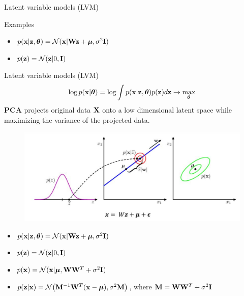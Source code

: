 \begin{frame}{Latent variable models (LVM)}
\begin{block}{Examples}
\begin{minipage}[t]{0.53\columnwidth}
\begin{figure}
			\end{figure}
			\vspace{-0.3cm}
			\begin{itemize}
				\item $p(\mathbf{x} | \mathbf{z}, \boldsymbol{\theta}) = \mathcal{N}(\mathbf{x} | \mathbf{W} \mathbf{z} + \boldsymbol{\mu}, \sigma^2 \mathbf{I})$
				\item $p(\mathbf{z}) = \mathcal{N}(\mathbf{z} | 0, \mathbf{I})$
			\end{itemize}
		\end{minipage}
	\end{block}
\end{frame}
\begin{frame}{Latent variable models (LVM)}
	\[
	\log p(\mathbf{x} | \boldsymbol{\theta}) = \log \int p(\mathbf{x} | \mathbf{z}, \boldsymbol{\theta}) p(\mathbf{z}) d\mathbf{z} \rightarrow \max_{\boldsymbol{\theta}}
	\]
	\textbf{PCA} projects original data $\mathbf{X}$ onto a low dimensional latent space while maximizing the variance of the projected data. 
	\begin{figure}
		\centering
		\includegraphics[width=.7\linewidth]{figs/bayesian_pca}
	\end{figure}
	\vspace{-0.5cm}
	\begin{itemize}
		\item $p(\mathbf{x} | \mathbf{z}, \boldsymbol{\theta}) = \mathcal{N}(\mathbf{x} | \mathbf{W} \mathbf{z} + \boldsymbol{\mu}, \sigma^2 \mathbf{I})$
		\item $p(\mathbf{z}) = \mathcal{N}(\mathbf{z} | 0, \mathbf{I})$
		\item $p(\mathbf{x}) = \mathcal{N}(\mathbf{x} | \boldsymbol{\mu}, \mathbf{W} \mathbf{W}^T + \sigma^2 \mathbf{I})$
		\item $p(\mathbf{z} | \mathbf{x}) = \mathcal{N} \bigl(\mathbf{M}^{-1} \mathbf{W}^T (\mathbf{x} - \boldsymbol{\mu}), \sigma^2 \mathbf{M}\bigr)$, where $\mathbf{M} = \mathbf{W} \mathbf{W}^T + \sigma^2 \mathbf{I}$
	\end{itemize}
\end{frame}
